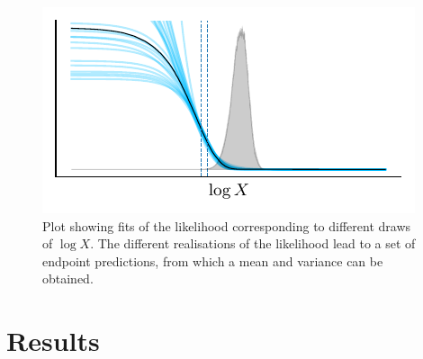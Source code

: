 \documentclass[usenatbib]{mnras} %
\begin{document}
\begin{figure}
\begin{center}
	\includegraphics{figures/gauss_overfit.pdf}
\end{center}
\caption{Plot showing fits of the likelihood corresponding to different draws of $\log X$. The different realisations of the likelihood lead to a set of endpoint predictions, from which a mean and variance can be obtained.}
\label{fig:gauss_overfit}
\end{figure}




\section{Results}\label{sec:Results}
\end{document}

